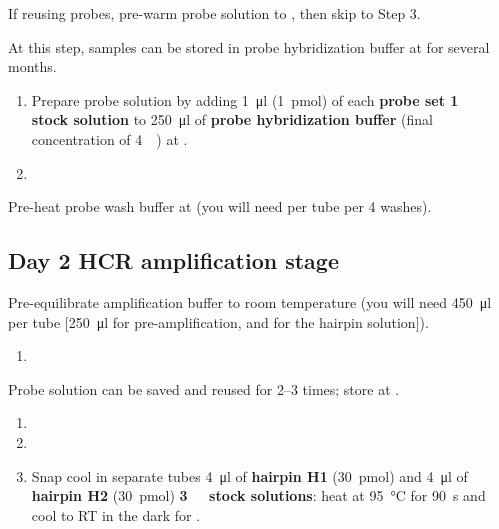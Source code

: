 \documentclass[10pt]{report}
\begin{document}
\bigskip\alert{If reusing probes, pre-warm probe solution to \thirtysevendegree, then skip to Step 3.}

\alert{At this step, samples can be stored in probe hybridization buffer at \minustwenty{} for several months.}

\begin{enumerate}[resume = steps]
	\item Prepare probe solution by adding \qty{1}{\ul} (\qty{1}{\pmol}) of each \textbf{probe set \qty{1}{\micro\molar} stock solution} to \qty{250}{\ul} of \textbf{probe hybridization buffer} (final concentration of \qty{4}{\nano\molar}) at \thirtysevendegree.\\
	\item {}
\end{enumerate}

\bigskip\alert{Pre-heat probe wash buffer at \thirtysevendegree{} (you will need \fivehunmicrol per tube per 4 washes).}


\subsection*{Day 2 \textendash{} HCR amplification stage}

\alert{Pre-equilibrate amplification buffer to room temperature (you will need \qty{450}{\ul} per tube [\qty{250}{\ul} for pre-amplification, and \twohunmicrol{} for the hairpin solution]).}
\begin{enumerate}[series = steps]
	\item {}
\end{enumerate}

\bigskip\alert{Probe solution can be saved and reused for 2--3 times; store at \minustwenty.}

\begin{enumerate}[resume = steps]
	\item {}
	\item {}
	\item Snap cool in separate tubes \qty{4}{\ul} of \textbf{hairpin H1} (\qty{30}{\pmol}) and \qty{4}{\ul} of \textbf{hairpin H2} (\qty{30}{\pmol}) \textbf{\qty{3}{\micro\molar} stock solutions}: heat at \qty{95}{\degreeCelsius} for \qty{90}{\s} and cool to RT in the dark for \halfhour.
\end{enumerate}
\end{document}
